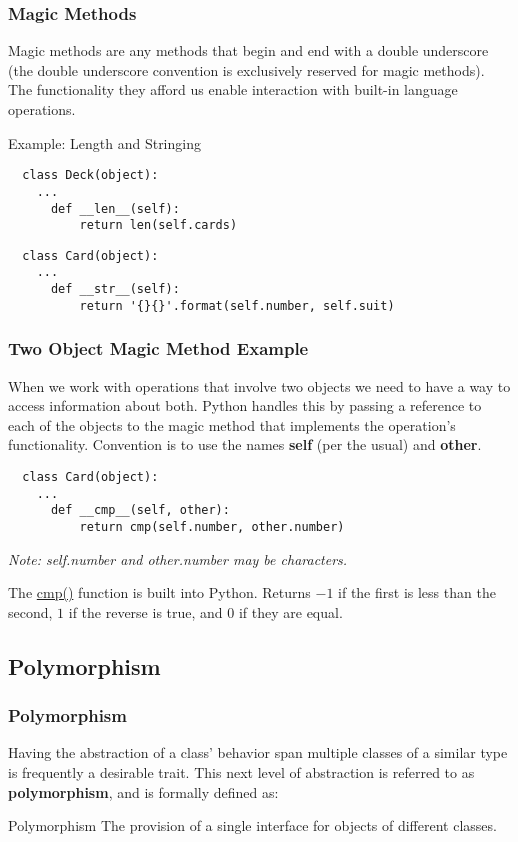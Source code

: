 \documentclass{beamer}
\begin{document}
\begin{frame}[fragile]
  \frametitle{Magic Methods}
  Magic methods are any methods that begin and end with a double underscore (the double underscore convention is exclusively reserved for magic methods). The functionality they afford us enable interaction with built-in language operations. \vspace{5mm}
  
  {\large Example: Length and Stringing}

  \begin{lstlisting}
  class Deck(object):
    ...
      def __len__(self):
          return len(self.cards)
  \end{lstlisting}
  \pause
  \begin{lstlisting}
  class Card(object):
    ...
      def __str__(self):
          return '{}{}'.format(self.number, self.suit)
  \end{lstlisting}
\end{frame}

\begin{frame}[fragile]
  \frametitle{Two Object Magic Method Example}
  When we work with operations that involve two objects we need to have a way to access information about both. Python handles this by passing a reference to each of the objects to the magic method that implements the operation's functionality. Convention is to use the names \textbf{self} (per the usual) and \textbf{other}. \vspace{2mm}
  \pause

  \begin{lstlisting}
  class Card(object):
    ...
      def __cmp__(self, other):
          return cmp(self.number, other.number)
  \end{lstlisting}

  \textit{Note: self.number and other.number may be characters.} \vspace{2mm}

  The {\color{blue}\href{https://docs.python.org/2/library/functions.html#cmp}{cmp()}} function is built into Python. Returns $-1$ if the first is less than the second, $1$ if the reverse is true, and $0$ if they are equal.
\end{frame}

\subsection{Polymorphism}
\begin{frame}
  \frametitle{Polymorphism}
  Having the abstraction of a class' behavior span multiple classes of a similar type is frequently a desirable trait. This next level of abstraction is referred to as \textbf{polymorphism}, and is formally defined as: \vspace{5mm}

  \begin{block}{Polymorphism}
    The provision of a single interface for objects of different classes.
  \end{block}
\end{frame}
\end{document}
